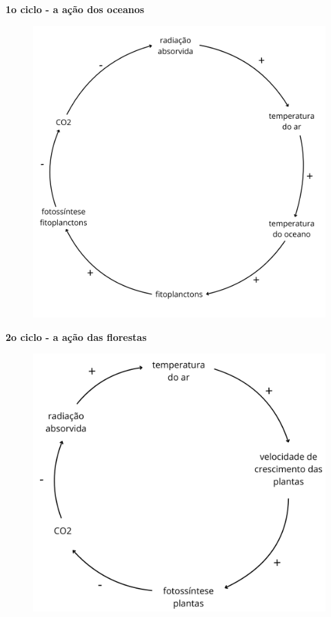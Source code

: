 \documentclass[11pt]{article}
\begin{document}
\begin{enumerate}
		\textbf{1o ciclo - a ação dos oceanos}\par
		\begin{figure}[!h]
			\centering
			\includegraphics[width=0.75\linewidth]{mapa1-1.png}
		\end{figure}
\pagebreak
        \textbf{2o ciclo - a ação das florestas}\par
		\begin{figure}[!ht]
			\centering
			\includegraphics[width=0.75\linewidth]{mapa1-2.png}
		\end{figure}


\end{enumerate}
\end{document}
